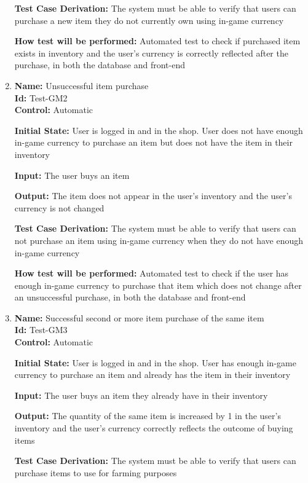 \documentclass[12pt, titlepage]{article}
\begin{document}
\begin{enumerate}
\textbf{Test Case Derivation:} The system must be able to verify that users can purchase a new item they do not currently own using in-game currency

\textbf{How test will be performed:} Automated test to check if purchased item exists in inventory and the user's currency is correctly reflected after the purchase, in both the database and front-end

\item {\textbf{Name:} Unsuccessful item purchase\\} %
\textbf{Id:} Test-GM2 \label{Test-GM2}\\

\textbf{Control:} Automatic

\textbf{Initial State:} User is logged in and in the shop. User does not have enough in-game currency to purchase an item but does not have the item in their inventory

\textbf{Input:} The user buys an item

\textbf{Output:} The item does not appear in the user's inventory and the user's currency is not changed

\textbf{Test Case Derivation:} The system must be able to verify that users can not purchase an item using in-game currency when they do not have enough in-game currency

\textbf{How test will be performed:} Automated test to check if the user has enough in-game currency to purchase that item which does not change after an unsuccessful purchase, in both the database and front-end

\item {\textbf{Name:} Successful second or more item purchase of the same item\\} %
\textbf{Id:} Test-GM3 \label{Test-GM3}\\

\textbf{Control:} Automatic

\textbf{Initial State:} User is logged in and in the shop. User has enough in-game currency to purchase an item and already has the item in their inventory

\textbf{Input:} The user buys an item they already have in their inventory 

\textbf{Output:} The quantity of the same item is increased by 1 in the user's inventory and the user's currency correctly reflects the outcome of buying items

\textbf{Test Case Derivation: }The system must be able to verify that users can purchase items to use for farming purposes


\end{enumerate}
\end{document}
